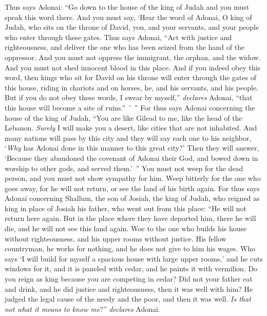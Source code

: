 \begin{biblechapter} %
\verse Thus says Adonai: “Go down to the house of the king of Judah and you must speak this word there.
\verse And you must say, ‘Hear the word of Adonai, O king of Judah, who sits on the throne of David, you, and your servants, and your people who enter through these gates.
\verse Thus says Adonai, “Act with justice and righteousness, and deliver the one who has been seized from the hand of the oppressor. And you must not oppress the immigrant, the orphan, and the widow. And you must not shed innocent blood in this place.
\verse And if you indeed obey this word, then kings who sit for David on his throne will enter through the gates of this house, riding in chariots and on horses, he, and his servants, and his people.
\verse But if you do not obey these words, I swear by myself,” \textit{declares} Adonai, “that this house will become a site of ruins.” ’ ”
\verse For thus says Adonai concerning the house of the king of Judah,
\verse “You are like Gilead to me, 
like the head of the Lebanon. 
\textit{Surely} I will make you a desert, 
like cities that are not inhabited.
\verse And many nations will pass by this city and they will say each one to his neighbor, ‘\textit{Why} has Adonai done in this manner to this great city?’
\verse Then they will answer, ‘Because they abandoned the covenant of Adonai their God, and bowed down in worship to other gods, and served them.’ ”
\verse You must not weep for the dead person, 
and you must not show sympathy for him. 
Weep bitterly for the one who goes away, 
for he will not return, or see the land of his birth again.
\verse For thus says Adonai concerning Shallum, the son of Josiah, the king of Judah, who reigned as king in place of Josiah his father, who went out from this place: “He will not return here again.
\verse But in the place where they have deported him, there he will die, and he will not see this land again.
\verse Woe to the one who builds his house without righteousness, 
and his upper rooms without justice. 
His fellow countryman, he works for nothing, 
and he does not give to him his wages.
\verse Who says ‘I will build for myself 
a spacious house with large upper rooms,’ 
and he cuts windows for it, 
and it is paneled with cedar, 
and he paints it with vermilion.
\verse Do you reign as king because you are competing in cedar? 
Did not your father eat and drink, 
and he did justice and righteousness, 
then it was well with him?
\verse He judged the legal cause of the needy and the poor, 
and then it was well. 
\textit{Is that not what it means to know me}?” \textit{declares} Adonai.

\end{biblechapter}
